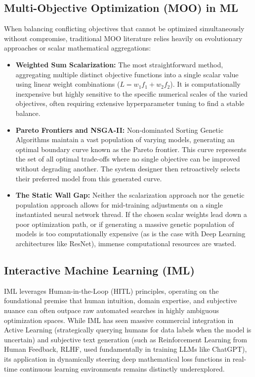 \documentclass[12pt,a4paper]{article}
\begin{document}
\subsection{Multi-Objective Optimization (MOO) in ML}
When balancing conflicting objectives that cannot be optimized simultaneously without compromise, traditional MOO literature relies heavily on evolutionary approaches or scalar mathematical aggregations:
\begin{itemize}
    \item \textbf{Weighted Sum Scalarization:} The most straightforward method, aggregating multiple distinct objective functions into a single scalar value using linear weight combinations ($L = w_1f_1 + w_2f_2$). It is computationally inexpensive but highly sensitive to the specific numerical scales of the varied objectives, often requiring extensive hyperparameter tuning to find a stable balance.
    \item \textbf{Pareto Frontiers and NSGA-II:} Non-dominated Sorting Genetic Algorithms maintain a vast population of varying models, generating an optimal boundary curve known as the Pareto frontier. This curve represents the set of all optimal trade-offs where no single objective can be improved without degrading another. The system designer then retroactively selects their preferred model from this generated curve.
    \item \textbf{The Static Wall Gap:} Neither the scalarization approach nor the genetic population approach allows for mid-training adjustments on a single instantiated neural network thread. If the chosen scalar weights lead down a poor optimization path, or if generating a massive genetic population of models is too computationally expensive (as is the case with Deep Learning architectures like ResNet), immense computational resources are wasted.
\end{itemize}

\subsection{Interactive Machine Learning (IML)}
IML leverages Human-in-the-Loop (HITL) principles, operating on the foundational premise that human intuition, domain expertise, and subjective nuance can often outpace raw automated searches in highly ambiguous optimization spaces. While IML has seen massive commercial integration in Active Learning (strategically querying humans for data labels when the model is uncertain) and subjective text generation (such as Reinforcement Learning from Human Feedback, RLHF, used fundamentally in training LLMs like ChatGPT), its application in dynamically steering deep mathematical loss functions in real-time continuous learning environments remains distinctly underexplored.
\end{document}
